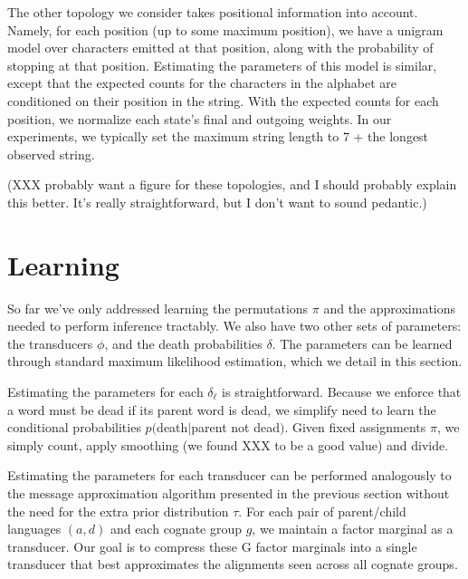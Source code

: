\documentclass[11pt,a4paper]{article}
\begin{document}
The other topology we consider takes positional information into
account.  Namely, for each position (up to some maximum position),
we have a unigram model over characters emitted at that position,
along with the probability of stopping at that position. Estimating
the parameters of this model is similar, except that the expected
counts for the characters in the alphabet are conditioned on their
position in the string. With the expected counts for each position,
we normalize each state's final and outgoing weights. In our
experiments, we typically set the maximum string length to 7 + the
longest observed string.

(XXX probably want a figure for these topologies, and I should probably
explain this better. It's really straightforward, but I don't want to sound pedantic.)

\section{Learning}

So far we've only addressed learning the permutations $\pi$ and
the approximations needed to perform inference tractably. We also
have two other sets of parameters: the transducers $\phi$, and the
death probabilities $\delta$. The parameters can be learned through
standard maximum likelihood estimation, which we detail in this
section.

Estimating the parameters for each $\delta_\ell$ is straightforward.
Because we enforce that a word must be dead if its parent word is
dead, we simplify need to learn the conditional probabilities
$p($death$|$parent not dead$)$. Given fixed assignments $\pi$, we
simply count, apply smoothing (we found XXX to be a good value) and
divide.

Estimating the parameters for each transducer can be performed
analogously to the message approximation algorithm presented in the
previous section without the need for the extra prior distribution
$\tau$. For each pair of parent/child languages $(a,d)$ and each
cognate group $g$, we maintain a factor marginal as a transducer.
Our goal is to compress these G factor marginals into a single
transducer that best approximates the alignments seen across all
cognate groups.
\end{document}
